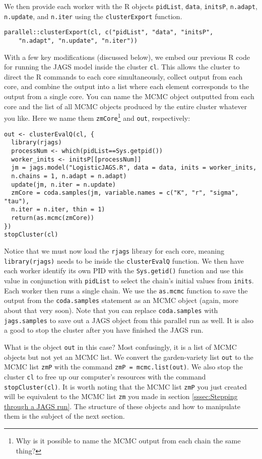 \documentclass[12pt,english]{article}
\begin{document}
\noindent We then provide each worker with the R objects \texttt{pidList}, \texttt{data}, \texttt{initsP}, \texttt{n.adapt}, \texttt{n.update}, and \texttt{n.iter} using the \texttt{clusterExport} function.

\begin{Verbatim}
parallel::clusterExport(cl, c("pidList", "data", "initsP", 
	"n.adapt", "n.update", "n.iter"))
\end{Verbatim}

\noindent With a few key modifications (discussed below), we embed our previous R code for running the JAGS model inside the cluster \texttt{cl}. This allows the cluster to direct the R commands to each core simultaneously, collect output from each core, and combine the output into a list where each element corresponds to the output from a single core. You can name the MCMC object outputted from each core and the list of all MCMC objects produced by the entire cluster whatever you like. Here we name them \texttt{zmCore}\footnote{Why is it possible to name the MCMC output from each chain the same thing?} and \texttt{out}, respectively:

\begin{Verbatim}
out <- clusterEvalQ(cl, {
  library(rjags)
  processNum <- which(pidList==Sys.getpid())
  worker_inits <- initsP[[processNum]]
  jm = jags.model("LogisticJAGS.R", data = data, inits = worker_inits, 
  n.chains = 1, n.adapt = n.adapt)
  update(jm, n.iter = n.update)
  zmCore = coda.samples(jm, variable.names = c("K", "r", "sigma", "tau"), 
  n.iter = n.iter, thin = 1)
  return(as.mcmc(zmCore))
}) 
stopCluster(cl)
\end{Verbatim}

\noindent Notice that we must now load the \texttt{rjags} library for each core, meaning \texttt{library(rjags)} needs to be inside the \texttt{clusterEvalQ} function. We then have each worker identify its own PID with the \texttt{Sys.getid()} function and use this value in conjunction with \texttt{pidList} to select the chain's initial values from \texttt{inits}. Each worker then runs a single chain. We use the \texttt{as.mcmc} function to save the output from the \texttt{coda.samples} statement as an MCMC object (again, more about that very soon). Note that you can replace \texttt{coda.samples} with \texttt{jags.samples} to save out a JAGS object from this parallel run as well. It is also a good to stop the cluster after you have finished the JAGS run. 

What is the object \texttt{out} in this case? Most confusingly, it is a list of MCMC objects but not yet an MCMC list. We convert the garden-variety list \texttt{out} to the MCMC list \texttt{zmP} with the command \texttt{zmP = mcmc.list(out)}. We also stop the cluster \texttt{cl} to free up our computer's resources with the command \texttt{stopCluster(cl)}. It is worth noting that the MCMC list \texttt{zmP} you just created will be equivalent to the MCMC list \texttt{zm} you made in section \ref{sssec:Stepping through a JAGS run}. The structure of these objects and how to manipulate them is the subject of the next section.
\end{document}
